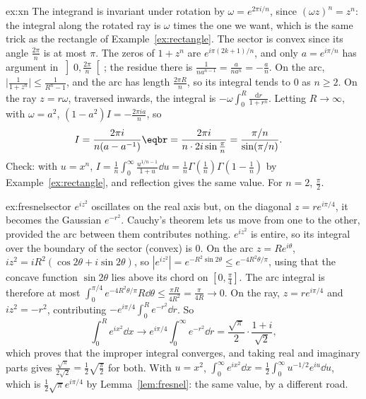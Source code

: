 \begin{solution}{ex:xn}
\idea The integrand is invariant under rotation by $\omega=e^{2\pi i/n}$, since $(\omega z)^n=z^n$: the integral along the rotated ray is $\omega$ times the
one we want, which is the same trick as the rectangle of Example~\ref{ex:rectangle}.
\writeup The sector is convex since its angle $\frac{2\pi}n$ is at most $\pi$. The zeros of $1+z^n$ are $e^{i\pi(2k+1)/n}$, and only $a=e^{i\pi/n}$ has argument in
$\left]0,\frac{2\pi}n\right[$; the residue there is $\frac1{na^{n-1}}=\frac a{na^n}=-\frac an$. On the arc, $\bigl|\frac1{1+z^n}\bigr|\le\frac1{R^n-1}$, and the arc has length $\frac{2\pi R}n$, so its integral
tends to $0$ as $n\ge2$. On the ray $z=r\omega$, traversed inwards, the integral is $-\omega\int_0^R\frac{\mathrm dr}{1+r^n}$. Letting $R\to\infty$, with $\omega=a^2$,
$(1-a^2)I=-\frac{2\pi ia}n$, so
\[
\begin{aligned}I&=\frac{2\pi i}{n(a-a^{-1})}\eqbr=\frac{2\pi i}{n\cdot2i\sin\frac\pi n}=\frac{\pi/n}{\sin(\pi/n)}.\end{aligned}
\]
Check: with $u=x^n$, $I=\frac1n\int_0^\infty\frac{u^{1/n-1}}{1+u}\dd u=\frac1n\Gamma(\frac1n)\Gamma(1-\frac1n)$ by Example~\ref{ex:rectangle}, and reflection gives the same value. For $n=2$, $\frac\pi2$.
\end{solution}

\begin{solution}{ex:fresnelsector}
\idea $e^{iz^2}$ oscillates on the real axis but, on the diagonal $z=re^{i\pi/4}$, it becomes the Gaussian $e^{-r^2}$. Cauchy's theorem lets us move from
one to the other, provided the arc between them contributes nothing.
\writeup $e^{iz^2}$ is entire, so its integral over the boundary of the sector (convex) is $0$. On the arc $z=Re^{i\theta}$, $iz^2=iR^2(\cos2\theta+i\sin2\theta)$, so
$|e^{iz^2}|=e^{-R^2\sin2\theta}\le e^{-4R^2\theta/\pi}$, using that the concave function $\sin2\theta$ lies above its chord on $[0,\frac\pi4]$. The arc integral is therefore at
most $\int_0^{\pi/4}e^{-4R^2\theta/\pi}R\dd\theta\le\frac{\pi R}{4R^2}=\frac\pi{4R}\to0$. On the ray, $z=re^{i\pi/4}$ and $iz^2=-r^2$, contributing $-e^{i\pi/4}\int_0^Re^{-r^2}\dd r$. So
\[
\int_0^Re^{ix^2}\dd x\longrightarrow e^{i\pi/4}\int_0^\infty e^{-r^2}\dd r=\frac{\sqrt\pi}2\cdot\frac{1+i}{\sqrt2},
\]
which proves that the improper integral converges, and taking real and imaginary parts gives $\frac{\sqrt\pi}{2\sqrt2}=\frac12\sqrt{\frac\pi2}$ for both. With $u=x^2$,
$\int_0^\infty e^{ix^2}\dd x=\frac12\int_0^\infty u^{-1/2}e^{iu}\dd u$, which is $\frac12\sqrt\pi e^{i\pi/4}$ by Lemma~\ref{lem:fresnel}: the same value, by a different road.
\end{solution}

